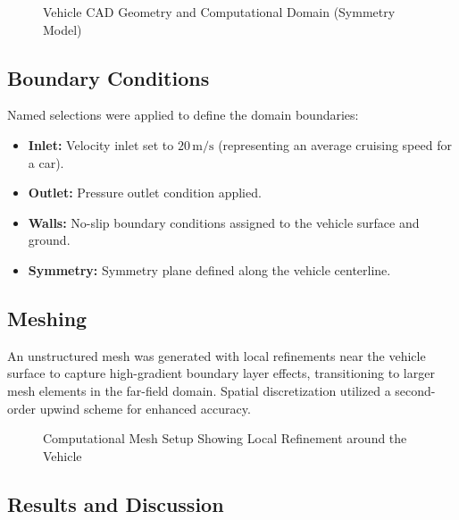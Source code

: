 \documentclass[12pt, a4paper]{article}
\begin{document}
	\begin{figure}[H]
		\centering
		\caption{Vehicle CAD Geometry and Computational Domain (Symmetry Model)}
		\label{fig:cad_geometry}
	\end{figure}
	
	\subsection{Boundary Conditions}
	Named selections were applied to define the domain boundaries:
	\begin{itemize}
		\item \textbf{Inlet:} Velocity inlet set to $20\,\text{m/s}$ (representing an average cruising speed for a car).
		\item \textbf{Outlet:} Pressure outlet condition applied.
		\item \textbf{Walls:} No-slip boundary conditions assigned to the vehicle surface and ground.
		\item \textbf{Symmetry:} Symmetry plane defined along the vehicle centerline.
	\end{itemize}
	
	\subsection{Meshing}
	An unstructured mesh was generated with local refinements near the vehicle surface to capture high-gradient boundary layer effects, transitioning to larger mesh elements in the far-field domain. Spatial discretization utilized a second-order upwind scheme for enhanced accuracy.
	
	\begin{figure}[H]
		\centering
		\caption{Computational Mesh Setup Showing Local Refinement around the Vehicle}
		\label{fig:mesh_domain}
	\end{figure}
	
	\subsection{Results and Discussion}
	
\end{document}
